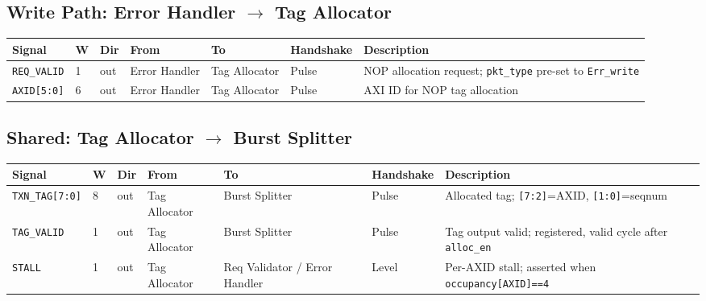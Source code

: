\documentclass[11pt,a4paper]{article}
\begin{document}
\subsection{Write Path: Error Handler $\rightarrow$ Tag Allocator}

\begin{tabularx}{\textwidth}{L{3.0cm} C{0.8cm} C{1.0cm} L{2.2cm} L{2.2cm} L{2.0cm} X}
\toprule
\textbf{Signal} & \textbf{W} & \textbf{Dir} & \textbf{From} & \textbf{To} & \textbf{Handshake} & \textbf{Description} \\
\midrule
\texttt{REQ\_VALID}    & 1 & out & Error Handler & Tag Allocator & Pulse & NOP allocation request; \texttt{pkt\_type} pre-set to \texttt{Err\_write} \\
\texttt{AXID[5:0]}     & 6 & out & Error Handler & Tag Allocator & Pulse & AXI ID for NOP tag allocation \\
\bottomrule
\end{tabularx}

\subsection{Shared: Tag Allocator $\rightarrow$ Burst Splitter}

\begin{tabularx}{\textwidth}{L{3.0cm} C{0.8cm} C{1.0cm} L{2.2cm} L{2.2cm} L{2.0cm} X}
\toprule
\textbf{Signal} & \textbf{W} & \textbf{Dir} & \textbf{From} & \textbf{To} & \textbf{Handshake} & \textbf{Description} \\
\midrule
\texttt{TXN\_TAG[7:0]} & 8 & out & Tag Allocator & Burst Splitter & Pulse & Allocated tag; \texttt{[7:2]}=AXID, \texttt{[1:0]}=seqnum \\
\texttt{TAG\_VALID}    & 1 & out & Tag Allocator & Burst Splitter & Pulse & Tag output valid; registered, valid cycle after \texttt{alloc\_en} \\
\texttt{STALL}         & 1 & out & Tag Allocator & Req Validator / Error Handler & Level & Per-AXID stall; asserted when \texttt{occupancy[AXID]==4} \\
\bottomrule
\end{tabularx}

\end{document}
